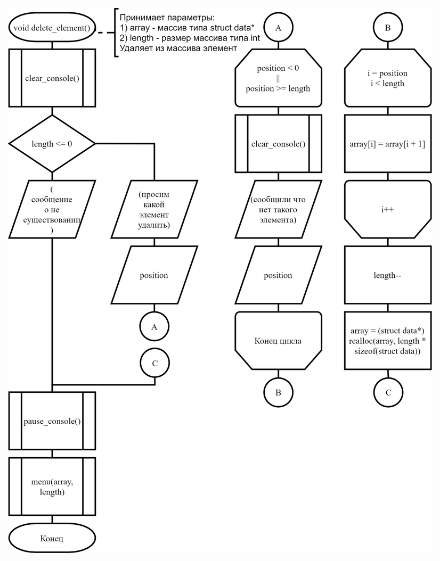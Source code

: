 \begin{figure}[!htp]
    \includegraphics{../../Makefile-project/src/menu/delete_element/delete_element.png}
\end{figure}

